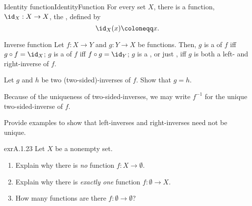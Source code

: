 \begin{exm}{Identity function}{IdentityFunction}
For every set $X$, there is a function, $\id _X:X\rightarrow X$, the , defined by
\begin{equation}
\id _X(x)\coloneqq x.
\end{equation}
\end{exm}
\begin{dfn}{Inverse function}{}
Let $f\colon X\rightarrow Y$ and $g\colon Y\rightarrow X$ be functions.  Then, $g$ is a  of $f$ iff $g\circ f=\id _X$; $g$ is a  of $f$ iff $f\circ g=\id _Y$; $g$ is a , or just , iff $g$ is both a left- and right-inverse of $f$.
\begin{exr}[breakable=false]{}{}
Let $g$ and $h$ be two (two-sided)-inverses of $f$.  Show that $g=h$.
\end{exr}
Because of the uniqueness of two-sided-inverses, we may write $f^{-1}$ for the unique two-sided-inverse of $f$.
\end{dfn}
\begin{exr}{}{}
Provide examples to show that left-inverses and right-inverses need not be unique.
\end{exr}
\begin{exr}{}{exrA.1.23}
Let $X$ be a nonempty set.
\begin{enumerate}
\item \label{enmA.1.23.i}Explain why there is \emph{no} function $f\colon X\rightarrow \emptyset$.
\item \label{enmA.1.23.ii}Explain why there is \emph{exactly one} function $f\colon \emptyset \rightarrow X$.
\item \label{enmA.1.23.iii}How many functions are there $f\colon \emptyset \rightarrow \emptyset$?
\end{enumerate}
\end{exr}
